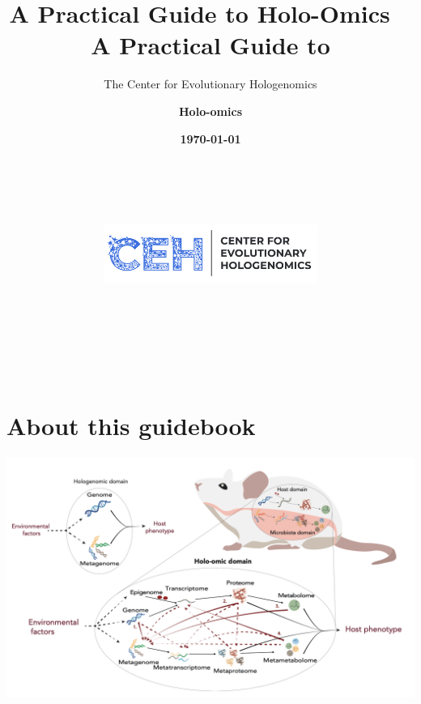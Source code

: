 \documentclass[
]{book}
\title{A Practical Guide to Holo-Omics}
\author{The Center for Evolutionary Hologenomics}
\date{}
\begin{document}
\title{%
       \vspace{0.5cm} %
       \fontsize{38}{38} %
       \selectfont %
       \\ A Practical Guide to} %
\author{\fontsize{64}{64}\selectfont \textbf{Holo-omics}}
\date{\fontsize{12}{14}\selectfont \textbf{\today}\\[6cm]
      \includegraphics[width=7cm,height=7cm]{images/ceh_blue.png}}
\maketitle

{
\setcounter{tocdepth}{1}
\tableofcontents
}
\hypertarget{about-this-guidebook}{%
\chapter*{About this guidebook}\label{about-this-guidebook}}

\includegraphics{images/holo-omics_overview_nyholm.png}
\end{document}
